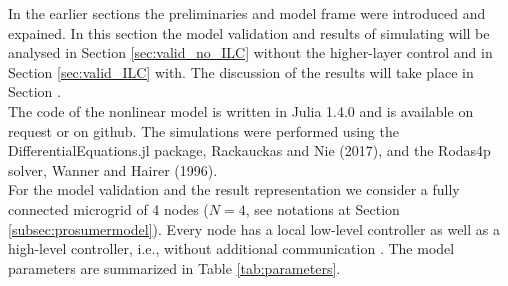In the earlier sections the preliminaries and model frame were introduced and expained. In this section the model validation and results of simulating will be analysed in Section \ref{sec:valid_no_ILC} without the higher-layer control and in Section \ref{sec:valid_ILC} with. The discussion of the results will take place in Section .
\\The code of the nonlinear model is written in Julia 1.4.0 and
is available on request or on github. The simulations were performed using the DifferentialEquations.jl package, Rackauckas and Nie (2017), and the Rodas4p solver, Wanner and Hairer (1996).
\\For the model validation and the result representation we consider a fully connected microgrid of 4 nodes ($N=4$, see notations at Section \ref{subsec:prosumermodel}). Every node has a local low-level controller as well as a high-level controller, i.e., without additional communication \cite{paperilc}. The model parameters are summarized in Table \ref{tab:parameters}.

